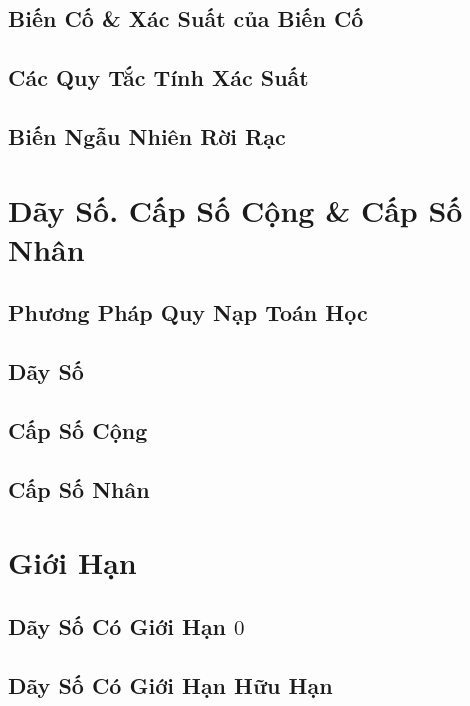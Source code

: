\documentclass[oneside]{book}
\numberwithin{equation}{section}
\begin{document}
\section{Biến Cố \& Xác Suất của Biến Cố}

\section{Các Quy Tắc Tính Xác Suất}

\section{Biến Ngẫu Nhiên Rời Rạc}


\chapter{Dãy Số. Cấp Số Cộng \& Cấp Số Nhân}

\section{Phương Pháp Quy Nạp Toán Học}

\section{Dãy Số}

\section{Cấp Số Cộng}

\section{Cấp Số Nhân}


\chapter{Giới Hạn}

\section{Dãy Số Có Giới Hạn $0$}

\section{Dãy Số Có Giới Hạn Hữu Hạn}
\end{document}
